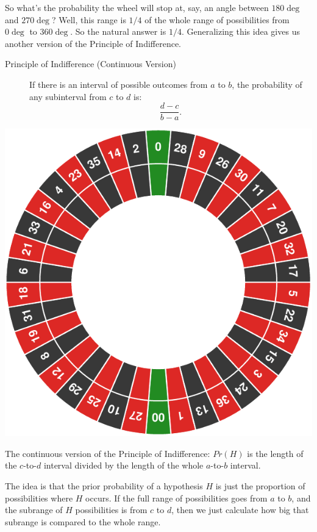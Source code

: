 \documentclass[justified]{tufte-book}
\theoremstyle{definition}
\theoremstyle{definition}
\theoremstyle{definition}
\theoremstyle{remark}
\begin{document}
So what's the probability the wheel will stop at, say, an angle between
\(180\deg\) and \(270\deg\)? Well, this range is \(1/4\) of the whole
range of possibilities from \(0\deg\) to \(360\deg\). So the natural
answer is \(1/4\). Generalizing this idea gives us another version of
the Principle of Indifference.

\begin{description}
\item[Principle of Indifference (Continuous Version)]
If there is an interval of possible outcomes from \(a\) to \(b\), the
probability of any subinterval from \(c\) to \(d\) is:
\[\frac{d-c}{b-a}.\]
\end{description}

\begin{marginfigure}
\includegraphics{_main_files/figure-latex/unnamed-chunk-131-1} \caption[The continuous version of the Principle of Indifference]{The continuous version of the Principle of Indifference: $Pr(H)$ is the length of the $c$-to-$d$ interval divided by the length of the whole $a$-to-$b$ interval.}\label{fig:unnamed-chunk-131}
\end{marginfigure}

The idea is that the prior probability of a hypothesis \(H\) is just the
proportion of possibilities where \(H\) occurs. If the full range of
possibilities goes from \(a\) to \(b\), and the subrange of \(H\)
possibilities is from \(c\) to \(d\), then we just calculate how big
that subrange is compared to the whole range.
\end{document}
